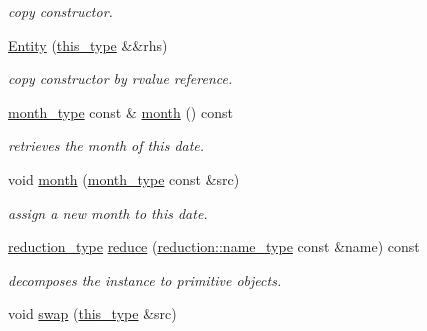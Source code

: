 \begin{DoxyCompactItemize}
\begin{DoxyCompactList}\small\item\em copy constructor. \end{DoxyCompactList}\item 
\hypertarget{classhryky_1_1date_1_1_entity_a778d4b81218074a90c52423eca340898}{\hyperlink{classhryky_1_1date_1_1_entity_a778d4b81218074a90c52423eca340898}{Entity} (\hyperlink{classhryky_1_1date_1_1_entity_aa89e431c521eed48992301fe010a9eaa}{this\-\_\-type} \&\&rhs)}\label{classhryky_1_1date_1_1_entity_a778d4b81218074a90c52423eca340898}

\begin{DoxyCompactList}\small\item\em copy constructor by rvalue reference. \end{DoxyCompactList}\item 
\hypertarget{classhryky_1_1date_1_1_entity_a6274c7cdd7a96a7549bd0c042fb99208}{\hyperlink{classhryky_1_1_kind}{month\-\_\-type} const \& \hyperlink{classhryky_1_1date_1_1_entity_a6274c7cdd7a96a7549bd0c042fb99208}{month} () const }\label{classhryky_1_1date_1_1_entity_a6274c7cdd7a96a7549bd0c042fb99208}

\begin{DoxyCompactList}\small\item\em retrieves the month of this date. \end{DoxyCompactList}\item 
\hypertarget{classhryky_1_1date_1_1_entity_a09f82dfd59dfe7d6f6aefe2ae1ee627b}{void \hyperlink{classhryky_1_1date_1_1_entity_a09f82dfd59dfe7d6f6aefe2ae1ee627b}{month} (\hyperlink{classhryky_1_1_kind}{month\-\_\-type} const \&src)}\label{classhryky_1_1date_1_1_entity_a09f82dfd59dfe7d6f6aefe2ae1ee627b}

\begin{DoxyCompactList}\small\item\em assign a new month to this date. \end{DoxyCompactList}\item 
\hypertarget{classhryky_1_1date_1_1_entity_a03007b935aa471c78e42a21e80fb4131}{\hyperlink{namespacehryky_a343a9a4c36a586be5c2693156200eadc}{reduction\-\_\-type} \hyperlink{classhryky_1_1date_1_1_entity_a03007b935aa471c78e42a21e80fb4131}{reduce} (\hyperlink{namespacehryky_1_1reduction_ac686c30a4c8d196bbd0f05629a6b921f}{reduction\-::name\-\_\-type} const \&name) const }\label{classhryky_1_1date_1_1_entity_a03007b935aa471c78e42a21e80fb4131}

\begin{DoxyCompactList}\small\item\em decomposes the instance to primitive objects. \end{DoxyCompactList}\item 
\hypertarget{classhryky_1_1date_1_1_entity_aa7020a3768aed225c8a9665ffd8c84ac}{void \hyperlink{classhryky_1_1date_1_1_entity_aa7020a3768aed225c8a9665ffd8c84ac}{swap} (\hyperlink{classhryky_1_1date_1_1_entity_aa89e431c521eed48992301fe010a9eaa}{this\-\_\-type} \&src)}\label{classhryky_1_1date_1_1_entity_aa7020a3768aed225c8a9665ffd8c84ac}


\end{DoxyCompactItemize}
